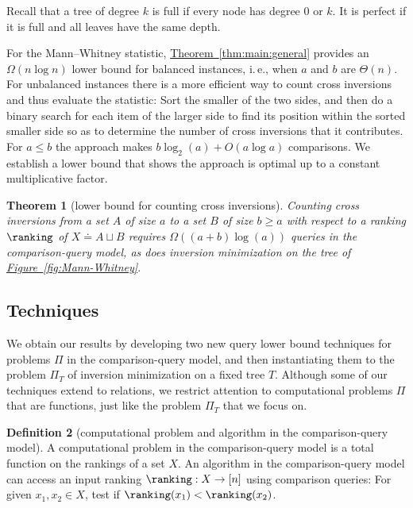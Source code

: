 \documentclass[11pt]{article}
\numberwithin{equation}{section}
\newtheorem{theorem}{Theorem}[section]
\theoremstyle{definition}
\newtheorem{definition}[theorem]{Definition}
\theoremstyle{plain}
\newcommand{\ie}{i.\,e.}
\newcommand{\expref}[2]{\hyperref[#2]{#1~\ref{#2}}}
\begin{document}
Recall that a tree of degree $k$ is full if every node has degree 0 or $k$. It is perfect if it is full and all leaves have the same depth.

For the Mann--Whitney statistic, \expref{Theorem}{thm:main:general} provides an $\Omega(n \log n)$ lower bound for balanced instances, \ie, when $a$ and $b$ are $\Theta(n)$. For unbalanced instances there is a more efficient way to count cross inversions and thus evaluate the statistic: Sort the smaller of the two sides, and then do a binary search for each item of the larger side to find its position within the sorted smaller side so as to determine the number of cross inversions that it contributes. For $a \le b$ the approach makes $b \log_2(a) + O(a \log a)$ comparisons. We establish a lower bound that shows the approach is optimal up to a constant multiplicative factor.
\begin{theorem}[lower bound for counting cross inversions]\label{thm:Mann-Whitney}
Counting cross inversions from a set $A$ of size $a$ to a set $B$ of size $b \ge a$ with respect to a ranking $\ranking$ of $X \doteq A \sqcup B$ requires $\Omega((a+b)\log(a))$ queries in the comparison-query model, as does inversion minimization on the tree of \expref{Figure}{fig:Mann-Whitney}.
\end{theorem}

\subsection{Techniques} 
%
We obtain our results by developing two new query lower bound techniques for
%
problems $\Pi$ in the comparison-query model, and then instantiating them to the problem $\Pi_T$ of inversion minimization on a fixed tree $T$. Although some of our techniques extend to relations, we restrict attention to computational problems $\Pi$ that are functions, %
%
just like the problem $\Pi_T$ that we focus on.
\begin{definition}[computational problem and algorithm in the comparison-query model]
\label{def:computational-problem}
A computational problem in the comparison-query model is a total function on the rankings of a set $X$. An algorithm in the comparison-query model can access an input ranking $\ranking: X \to [n]$ using comparison queries: For given $x_1,x_2 \in X$, test if $\ranking(x_1)< \ranking(x_2)$.
\end{definition}
\end{document}
